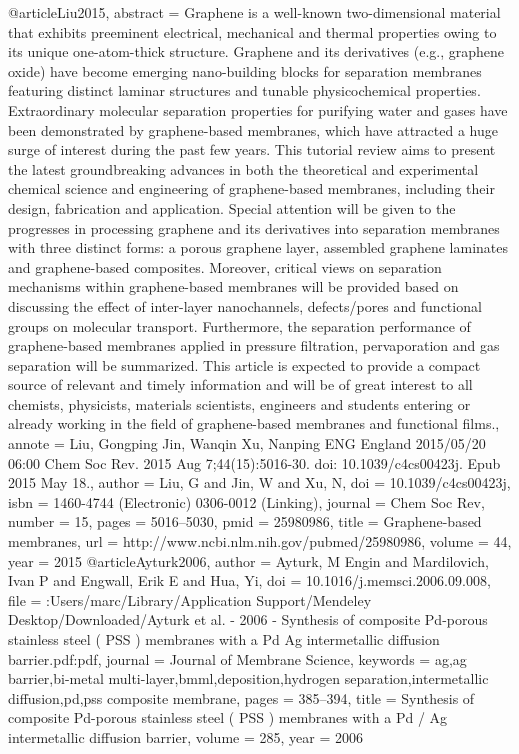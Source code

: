 @article{Liu2015,
abstract = {Graphene is a well-known two-dimensional material that exhibits preeminent electrical, mechanical and thermal properties owing to its unique one-atom-thick structure. Graphene and its derivatives (e.g., graphene oxide) have become emerging nano-building blocks for separation membranes featuring distinct laminar structures and tunable physicochemical properties. Extraordinary molecular separation properties for purifying water and gases have been demonstrated by graphene-based membranes, which have attracted a huge surge of interest during the past few years. This tutorial review aims to present the latest groundbreaking advances in both the theoretical and experimental chemical science and engineering of graphene-based membranes, including their design, fabrication and application. Special attention will be given to the progresses in processing graphene and its derivatives into separation membranes with three distinct forms: a porous graphene layer, assembled graphene laminates and graphene-based composites. Moreover, critical views on separation mechanisms within graphene-based membranes will be provided based on discussing the effect of inter-layer nanochannels, defects/pores and functional groups on molecular transport. Furthermore, the separation performance of graphene-based membranes applied in pressure filtration, pervaporation and gas separation will be summarized. This article is expected to provide a compact source of relevant and timely information and will be of great interest to all chemists, physicists, materials scientists, engineers and students entering or already working in the field of graphene-based membranes and functional films.},
annote = {Liu, Gongping
Jin, Wanqin
Xu, Nanping
ENG
England
2015/05/20 06:00
Chem Soc Rev. 2015 Aug 7;44(15):5016-30. doi: 10.1039/c4cs00423j. Epub 2015 May 18.},
author = {Liu, G and Jin, W and Xu, N},
doi = {10.1039/c4cs00423j},
isbn = {1460-4744 (Electronic)
0306-0012 (Linking)},
journal = {Chem Soc Rev},
number = {15},
pages = {5016--5030},
pmid = {25980986},
title = {{Graphene-based membranes}},
url = {http://www.ncbi.nlm.nih.gov/pubmed/25980986},
volume = {44},
year = {2015}
}
@article{Ayturk2006,
author = {Ayturk, M Engin and Mardilovich, Ivan P and Engwall, Erik E and Hua, Yi},
doi = {10.1016/j.memsci.2006.09.008},
file = {:Users/marc/Library/Application Support/Mendeley Desktop/Downloaded/Ayturk et al. - 2006 - Synthesis of composite Pd-porous stainless steel ( PSS ) membranes with a Pd Ag intermetallic diffusion barrier.pdf:pdf},
journal = {Journal of Membrane Science},
keywords = {ag,ag barrier,bi-metal multi-layer,bmml,deposition,hydrogen separation,intermetallic diffusion,pd,pss composite membrane},
pages = {385--394},
title = {{Synthesis of composite Pd-porous stainless steel ( PSS ) membranes with a Pd / Ag intermetallic diffusion barrier}},
volume = {285},
year = {2006}
}
